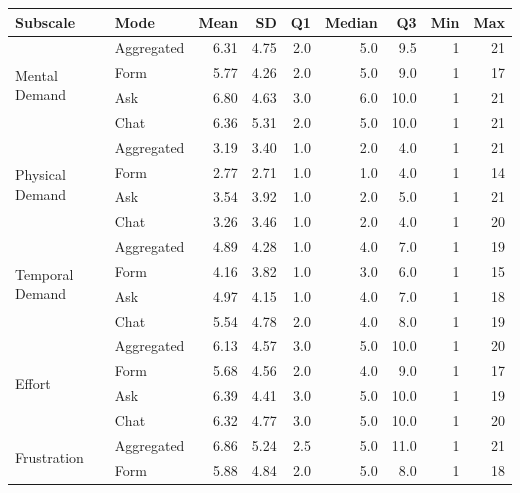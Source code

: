 \begin{table}[H]
\centering
\small
\begin{tabular}{@{}l l r r r r r r r@{}}
\toprule
Subscale & Mode & Mean & SD & Q1 & Median & Q3 & Min & Max \\
\midrule
\multirow{4}{*}{Mental Demand}     & Aggregated  & 6.31 & 4.75 & 2.0 & 5.0  & 9.5  & 1 & 21 \\
                                   & Form & 5.77 & 4.26 & 2.0 & 5.0  & 9.0  & 1 & 17 \\
                                   & Ask  & 6.80 & 4.63 & 3.0 & 6.0  & 10.0 & 1 & 21 \\
                                   & Chat & 6.36 & 5.31 & 2.0 & 5.0  & 10.0 & 1 & 21 \\
\midrule
\multirow{4}{*}{Physical Demand}   & Aggregated  & 3.19 & 3.40 & 1.0 & 2.0  & 4.0  & 1 & 21 \\
                                   & Form & 2.77 & 2.71 & 1.0 & 1.0  & 4.0  & 1 & 14 \\
                                   & Ask  & 3.54 & 3.92 & 1.0 & 2.0  & 5.0  & 1 & 21 \\
                                   & Chat & 3.26 & 3.46 & 1.0 & 2.0  & 4.0  & 1 & 20 \\
\midrule
\multirow{4}{*}{Temporal Demand}   & Aggregated  & 4.89 & 4.28 & 1.0 & 4.0  & 7.0  & 1 & 19 \\
                                   & Form & 4.16 & 3.82 & 1.0 & 3.0  & 6.0  & 1 & 15 \\
                                   & Ask  & 4.97 & 4.15 & 1.0 & 4.0  & 7.0  & 1 & 18 \\
                                   & Chat & 5.54 & 4.78 & 2.0 & 4.0  & 8.0  & 1 & 19 \\
\midrule
\multirow{4}{*}{Effort}            & Aggregated  & 6.13 & 4.57 & 3.0 & 5.0  & 10.0 & 1 & 20 \\
                                   & Form & 5.68 & 4.56 & 2.0 & 4.0  & 9.0  & 1 & 17 \\
                                   & Ask  & 6.39 & 4.41 & 3.0 & 5.0  & 10.0 & 1 & 19 \\
                                   & Chat & 6.32 & 4.77 & 3.0 & 5.0  & 10.0 & 1 & 20 \\
\midrule
\multirow{4}{*}{Frustration}       & Aggregated  & 6.86 & 5.24 & 2.5 & 5.0  & 11.0 & 1 & 21 \\
                                   & Form & 5.88 & 4.84 & 2.0 & 5.0  & 8.0  & 1 & 18 \\

\end{tabular}
\end{table}
